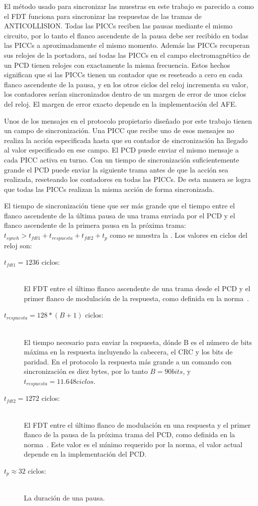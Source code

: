 \documentclass[a4paper, twoside, 11pt]{report}
\begin{document}
El método usado para sincronizar las muestras en este trabajo es parecido a como el FDT funciona para sincronizar las respuestas de las tramas de ANTICOLLISION. Todas las PICCs reciben las pausas mediante el mismo circuito, por lo tanto el flanco ascendente de la pausa debe ser recibido en todas las PICCs a aproximadamente el mismo momento. Además las PICCs recuperan sus relojes de la portadora, así todas las PICCs en el campo electromagnético de un PCD tienen relojes con exactamente la misma frecuencia. Estos hechos significan que si las PICCs tienen un contador que es reseteado a cero en cada flanco ascendente de la pausa, y en los otros ciclos del reloj incrementa su valor, los contadores serían sincronizados dentro de un margen de error de unos ciclos del reloj. El margen de error exacto depende en la implementación del AFE.

Unos de los mensajes en el protocolo propietario diseñado por este trabajo tienen un campo de sincronización. Una PICC que recibe uno de esos mensajes no realiza la acción especificada hasta que su contador de sincronización ha llegado al valor especificado en ese campo. El PCD puede enviar el mismo mensaje a cada PICC activa en turno. Con un tiempo de sincronización suficientemente grande el PCD puede enviar la siguiente trama antes de que la acción sea realizada, reseteando los contadores en todas las PICCs. De esta manera se logra que todas las PICCs realizan la misma acción de forma sincronizada.

El tiempo de sincronización tiene que ser más grande que el tiempo entre el flanco ascendente de la última pausa de una trama enviada por el PCD y el flanco ascendente de la primera pausa en la próxima trama: $t_{synch} > t_{fdt1} + t_{respuesta} + t_{fdt2} + t_p$ como se muestra la . Los valores en ciclos del reloj son:

\begin{description}
  \item[$t_{fdt1} = 1236$ ciclos:] \hfill \\ El FDT entre el último flanco ascendente de una trama desde el PCD y el primer flanco de modulación de la respuesta, como definida en la norma~\cite{iso14443-3}.
  \item[$t_{respuesta} = 128 * \left(B + 1\right)$ ciclos:] \hfill \\ El tiempo necesario para enviar la respuesta, dónde B es el número de bits máxima en la respuesta incluyendo la cabecera, el CRC y los bits de paridad. En el protocolo la respuesta más grande a un comando con sincronización es diez bytes, por lo tanto $B = 90 bits$, y $t_{respuesta} = 11.648 ciclos$.
  \item[$t_{fdt2} = 1272$ ciclos:] \hfill \\ El FDT entre el último flanco de modulación en una respuesta y el primer flanco de la pausa de la próxima trama del PCD, como definida en la norma~\cite{iso14443-3}. Este valor es el mínimo requerido por la norma, el valor actual depende en la implementación del PCD.
  \item[$t_p \approx 32$ ciclos:] \hfill \\ La duración de una pausa.
\end{description}
\end{document}
